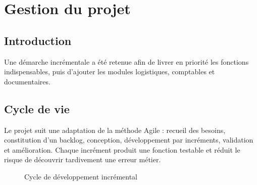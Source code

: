 \documentclass[12pt,a4paper,oneside]{report}
\begin{document}
\chapter{Gestion du projet}
\section*{Introduction}
Une démarche incrémentale a été retenue afin de livrer en priorité les fonctions indispensables, puis d'ajouter les modules logistiques, comptables et documentaires.

\section{Cycle de vie}
Le projet suit une adaptation de la méthode Agile : recueil des besoins, constitution d'un backlog, conception, développement par incréments, validation et amélioration. Chaque incrément produit une fonction testable et réduit le risque de découvrir tardivement une erreur métier.

\begin{figure}[H]\centering
{}
\caption{Cycle de développement incrémental}
\end{figure}
\end{document}
